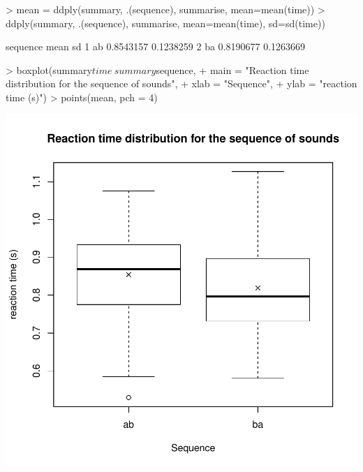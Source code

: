 \documentclass[12pt,a4paper]{article}
\begin{document}
\begin{itemize}
\begin{Schunk}
\begin{Sinput}
> mean = ddply(summary, .(sequence), summarise, mean=mean(time))
> ddply(summary, .(sequence), summarise, mean=mean(time), sd=sd(time))
\end{Sinput}
\begin{Soutput}
  sequence      mean        sd
1       ab 0.8543157 0.1238259
2       ba 0.8190677 0.1263669
\end{Soutput}
\begin{Sinput}
> boxplot(summary$time~summary$sequence,
+ main = "Reaction time distribution for the sequence of sounds",
+ xlab = "Sequence",
+ ylab = "reaction time (s)")
> points(mean, pch = 4)
\end{Sinput}
\end{Schunk}
\includegraphics{report-012}


\end{itemize}
\end{document}

